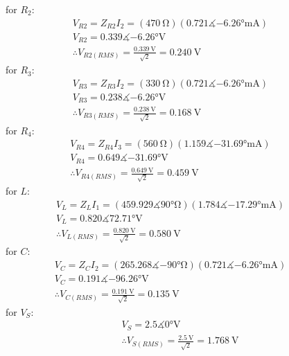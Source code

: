 \documentclass[letterpaper]{article}
\begin{document}
for $R_2$:
\begin{gather*}
    V_{R2} = Z_{R2}I_2 = (\SI{470}{\ohm})(0.721\measuredangle\ang{-6.26}\si{\milli\ampere})\qquad \\
    V_{R2} = 0.339\measuredangle\ang{-6.26}\si{\volt}\\
    \therefore V_{R2(RMS)} = \frac{\SI{0.339}{\volt}}{\sqrt{2}} = \SI{0.240}{\volt}
\end{gather*}
for $R_3$:
\begin{gather*}
    V_{R3} = Z_{R3}I_2 = (\SI{330}{\ohm})(0.721\measuredangle\ang{-6.26}\si{\milli\ampere})\qquad \\
    V_{R3} = 0.238\measuredangle\ang{-6.26}\si{\volt}\\
    \therefore V_{R3(RMS)} = \frac{\SI{0.238}{\volt}}{\sqrt{2}} = \SI{0.168}{\volt}
\end{gather*}
for $R_4$:
\begin{gather*}
    V_{R4} = Z_{R4}I_3 = (\SI{560}{\ohm})(1.159\measuredangle\ang{-31.69}\si{\milli\ampere})\qquad \\
    V_{R4} = 0.649\measuredangle\ang{-31.69}\si{\volt}\\
    \therefore V_{R4(RMS)} = \frac{\SI{0.649}{\volt}}{\sqrt{2}} = \SI{0.459}{\volt}
\end{gather*}
for $L$:
\begin{gather*}
    V_{L} = Z_{L}I_1 = (459.929\measuredangle\ang{90}\si{\ohm})(1.784\measuredangle\ang{-17.29}\si{\milli\ampere})\qquad \\
    V_{L} = 0.820\measuredangle\ang{72.71}\si{\volt}\\
    \therefore V_{L(RMS)} = \frac{\SI{0.820}{\volt}}{\sqrt{2}} = \SI{0.580}{\volt}
\end{gather*}
for $C$:
\begin{gather*}
    V_{C} = Z_{C}I_2 = (265.268\measuredangle\ang{-90}\si{\ohm})(0.721\measuredangle\ang{-6.26}\si{\milli\ampere})\qquad \\
    V_{C} = 0.191\measuredangle\ang{-96.26}\si{\volt}\\
    \therefore V_{C(RMS)} = \frac{\SI{0.191}{\volt}}{\sqrt{2}} = \SI{0.135}{\volt}
\end{gather*}
for $V_S$:
\begin{gather*}
    V_{S} = 2.5\measuredangle\ang{0}\si{\volt}\\
    \therefore V_{S(RMS)} = \frac{\SI{2.5}{\volt}}{\sqrt{2}} = \SI{1.768}{\volt}
\end{gather*}
\end{document}
